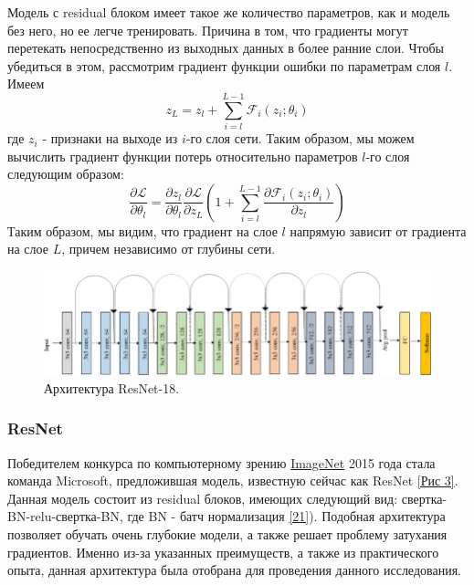 Модель с residual блоком имеет такое же количество параметров, как и модель без него, но ее легче тренировать. Причина в том, что градиенты могут перетекать непосредственно из выходных данных в более ранние слои. Чтобы убедиться в этом, рассмотрим градиент функции ошибки по параметрам слоя $l$. Имеем
\begin{equation}
	z_L = z_l + \sum_{i=l}^{L-1} \mathcal{F}_i(z_i ; \theta_i)
\end{equation}
где $z_i$ - признаки на выходе из $i$-го слоя сети. Таким образом, мы можем вычислить градиент функции потерь относительно параметров $l$-го слоя следующим образом:
\begin{equation}
	\frac{\partial \mathcal{L}}{\partial \theta_{l}} = 
	\frac{\partial z_{l}}{\partial \theta_{l}} \frac{\partial \mathcal{L}}{\partial z_{L}}
	(1 + \sum_{i=l}^{L-1} \frac{\partial \mathcal{F}_i(z_i; \theta_i)}{\partial z_{l}})
\end{equation}
Таким образом, мы видим, что градиент на слое $l$ напрямую зависит от градиента на слое $L$, причем независимо от глубины сети.
\begin{figure}
    \centering
    \includegraphics[scale=0.3]{./images/ResNet18.png}
    \caption{\protect\hypertarget{image3}{Архитектура ResNet-18.}}
\end{figure}

\newpage
\subsubsection{ResNet}
Победителем конкурса по компьютерному зрению \href{https://image-net.org/challenges/LSVRC/2015/}{ImageNet} 2015 года стала команда Microsoft, предложившая модель, известную сейчас как ResNet \hyperlink{image3}{[Рис 3]}. Данная модель состоит из residual блоков, имеющих следующий вид: свертка-BN-relu-свертка-BN, где BN - батч нормализация \hyperlink{cite.Iof15}{[21]}). Подобная архитектура позволяет обучать очень глубокие модели, а также решает проблему затухания градиентов. Именно из-за указанных преимуществ, а также из практического опыта, данная архитектура была отобрана для проведения данного исследования.

